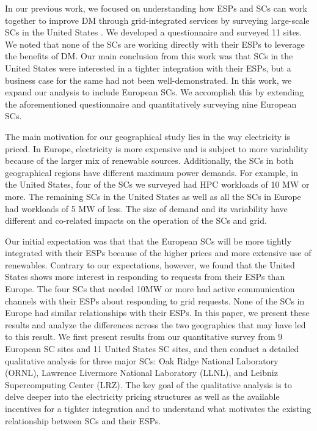In our previous work, we focused on understanding how ESPs and SCs can work together to improve DM through grid-integrated services by surveying large-scale SCs in the United States \cite{BatesESP}. We developed a questionnaire and surveyed 11 sites. We noted that none of the SCs are working directly with their ESPs to leverage the benefits of DM. Our main conclusion from this work was that SCs in the United States were interested in a tighter integration with their ESPs, but a business case for the same had not been well-demonstrated. In this work, we expand our analysis to include European SCs. We accomplish this by extending the aforementioned questionnaire and quantitatively surveying nine European SCs. 


The main motivation for our geographical study lies in the way electricity is priced. In Europe, electricity is more expensive and is subject to more variability because of the larger mix of renewable sources. Additionally, the SCs in both geographical regions have different maximum power demands. For example, in the United States, four of the SCs we surveyed had HPC workloads of 10 MW or more. The remaining SCs in the United States as well as all the SCs in Europe had workloads of 5 MW of less. The size of demand and its variability have different and co-related impacts on the operation of the SCs and grid. 

Our initial expectation was that that the European SCs will be more tightly integrated with their ESPs because of the higher prices and more extensive use of renewables.  Contrary to our expectations, however, we found that the United States shows more interest in responding to requests from their ESPs than Europe. The four SCs that needed 10MW or more had active communication channels with their ESPs about responding to grid requests.  None of the SCs in Europe had similar relationships with their ESPs. In this paper, we present these results and analyze the differences across the two geographies that may have led to this result. We first present results from our quantitative survey from 9 European SC sites and 11 United States SC sites, and then conduct a detailed qualitative analysis for three major SCs: Oak Ridge National Laboratory (ORNL), Lawrence Livermore National Laboratory (LLNL), and Leibniz Supercomputing Center (LRZ). The key goal of the qualitative analysis is to delve deeper into the electricity pricing structures as well as the available incentives for a tighter integration and to understand what motivates the existing relationship between SCs and their ESPs. 

